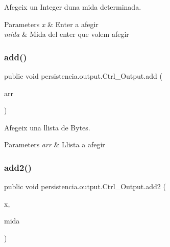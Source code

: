 Afegeix un Integer d\textquotesingle{}una mida determinada. 


\begin{DoxyParams}{Parameters}
{\em x} & Enter a afegir \\
\hline
{\em mida} & Mida del enter que volem afegir \\
\hline
\end{DoxyParams}
\mbox{\label{classpersistencia_1_1output_1_1Ctrl__Output_a5fb2f07198a77b4fac0f95ee48e3d0b9}} 
\subsubsection{\texorpdfstring{add()}{add()}\hspace{0.1cm}{\footnotesize\ttfamily [6/6]}}
{\footnotesize\ttfamily public void persistencia.\+output.\+Ctrl\+\_\+\+Output.\+add (\begin{DoxyParamCaption}\item[{Array\+List$<$ Byte $>$}]{arr }\end{DoxyParamCaption})\hspace{0.3cm}{\ttfamily [inline]}}



Afegeix una llista de Bytes. 


\begin{DoxyParams}{Parameters}
{\em arr} & Llista a afegir \\
\hline
\end{DoxyParams}
\mbox{\label{classpersistencia_1_1output_1_1Ctrl__Output_ad4738467c2312b0e079c14003e548dd6}} 
\subsubsection{\texorpdfstring{add2()}{add2()}}
{\footnotesize\ttfamily public void persistencia.\+output.\+Ctrl\+\_\+\+Output.\+add2 (\begin{DoxyParamCaption}\item[{int}]{x,  }\item[{int}]{mida }\end{DoxyParamCaption})\hspace{0.3cm}{\ttfamily [inline]}}



